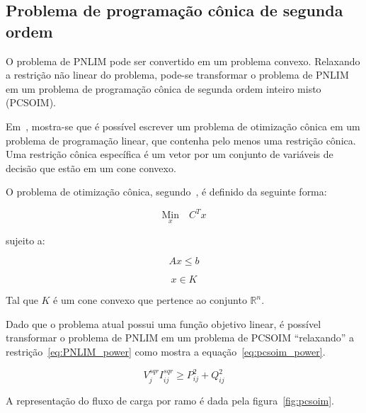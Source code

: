 \subsection{Problema de programação cônica de segunda ordem}

O problema de PNLIM pode ser convertido em um problema convexo. Relaxando a restrição não linear do problema, pode-se transformar o problema de PNLIM em um problema de programação cônica de segunda ordem inteiro misto (PCSOIM).

Em~\cite{Romais2014ReconfiguracaoMista}, mostra-se que é possível escrever um problema de otimização cônica em um problema de programação linear, que contenha pelo menos uma restrição cônica. 
Uma restrição cônica específica é um vetor por um conjunto de variáveis de decisão que estão em um cone convexo.

O problema de otimização cônica, segundo~\cite{Romais2014ReconfiguracaoMista}, é definido da seguinte forma:

\begin{equation}
    \underset{x}{\text{Min}}\quad C^{T}x
\end{equation}

\hspace{4cm}sujeito a:

\begin{equation}
    Ax \leq b
\end{equation}

\begin{equation}
    x\in K
\end{equation}

Tal que $K$ é um cone convexo que pertence ao conjunto $\mathbb{R}^n$.

Dado que o problema atual possui uma função objetivo linear, é possível transformar o problema de PNLIM em um problema de PCSOIM ``relaxando'' a restrição~\eqref{eq:PNLIM_power} como mostra a equação~\eqref{eq:pcsoim_power}.

\begin{equation}\label{eq:pcsoim_power}
    V_{j}^{sqr}I_{ij}^{sqr} \geq P_{ij}^2 + Q_{ij}^2
\end{equation}

A representação do fluxo de carga por ramo é dada pela figura~\ref{fig:pcsoim}. 


